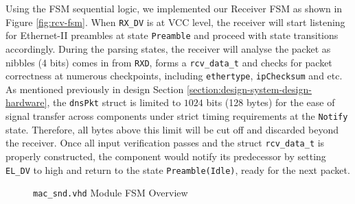 \documentclass[a4paper]{report}
\newcommand{\code}{\texttt}
\begin{document}
Using the FSM sequential logic, we implemented our Receiver FSM as shown in Figure \ref{fig:rcv-fsm}. When \code{RX\_DV} is at VCC level, the receiver will start listening for Ethernet-II preambles at state \code{Preamble} and proceed with state transitions accordingly. During the parsing states, the receiver will analyse the packet as nibbles (4 bits) comes in from \code{RXD}, forms a \code{rcv\_data\_t} and checks for packet correctness at numerous checkpoints, including \code{ethertype}, \code{ipChecksum} and etc. As mentioned previously in design Section \ref{section:design-system-design-hardware}, the \code{dnsPkt} struct is limited to $1024$ bits (128 bytes) for the ease of signal transfer across components under strict timing requirements at the \code{Notify} state. Therefore, all bytes above this limit will be cut off and discarded beyond the receiver. Once all input verification passes and the struct \code{rcv\_data\_t} is properly constructed, the component would notify its predecessor by setting \code{EL\_DV} to high and return to the state \code{Preamble(Idle)}, ready for the next packet.

\begin{figure}[h!]
  \caption{\code{mac\_snd.vhd} Module FSM Overview}
  \label{fig:snd-fsm}
\end{figure}
\end{document}

